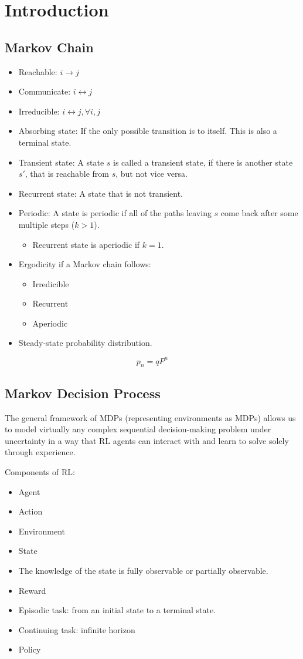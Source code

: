 \chapter{Introduction}
\section{Markov Chain}
\begin{itemize}
	\item Reachable: $i\to j$
	\item Communicate: $i\leftrightarrow j$
	\item Irreducible: $i\leftrightarrow j, \forall i,j$
	\item Absorbing state: If the only possible transition is to itself. This is also a terminal state.
	\item Transient state: A state $s$ is called a transient state, if there is another state $s'$, that is reachable from $s$, but not vice versa. 
	\item Recurrent state: A state that is not transient. 
	\item Periodic: A state is periodic if all of the paths leaving $s$ come back after some multiple steps ($k>1$). 
		\begin{itemize}
			\item Recurrent state is aperiodic if $k=1$.
		\end{itemize}
	\item Ergodicity if a Markov chain follows:
		\begin{itemize}
			\item Irredicible
			\item Recurrent
			\item Aperiodic
		\end{itemize}
	\item Steady-state probability distribution.
\end{itemize}

$$p_n = qP^n$$

\section{Markov Decision Process}

The general framework of MDPs (representing environments as MDPs) allows us to model virtually any complex sequential decision-making problem under uncertainty in a way that RL agents can interact with and learn to solve solely through experience. 

Components of RL:
\begin{itemize}
	\item Agent
	\item Action
	\item Environment
	\item State
	\item The knowledge of the state is fully observable or partially observable.
	\item Reward
	\item Episodic task: from an initial state to a terminal state.
	\item Continuing task: infinite horizon
	\item Policy
\end{itemize}


